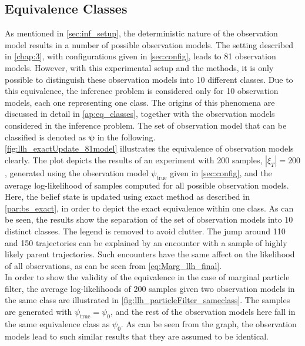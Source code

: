 \subsection{Equivalence Classes}
\label{sec:eq_classes}
As mentioned in \cref{sec:inf_setup}, the deterministic nature of the observation model results in a number of possible observation models. The setting described in \cref{chap:3}, with configurations given in \cref{sec:config}, leads to 81 observation models. However, with this experimental setup and the methods, it is only possible to distinguish these observation models into 10 different classes. Due to this equivalence, the inference problem is considered only for 10 observation models, each one representing one class. The origins of this phenomena are discussed in detail in \cref{ap:eq_classes}, together with the observation models considered in the inference problem. The set of observation model that can be classified is denoted as $ \symbf{\psi} $ in the following. \\
\autoref{fig:llh_exactUpdate_81model} illustrates the equivalence of observation models clearly. The plot depicts the results of an experiment with 200 samples, $ |\xi_T| = 200 $, generated using the observation model $ \psi_{\text{true}} $ given in \cref{sec:config}, and the average log-likelihood of samples computed for all possible observation models. Here, the belief state is updated using exact method as described in \cref{par:bs_exact}, in order to depict the exact equivalence within one class. As can be seen, the results show the separation of the set of observation models into 10 distinct classes. The legend is removed to avoid clutter. The jump around 110 and 150 trajectories can be explained by an encounter with a sample of highly likely parent trajectories. Such encounters have the same affect on the likelihood of all observations, as can be seen from \autoref{eq:Marg_llh_final}.\\
In order to show the validity of the equivalence in the case of marginal particle filter, the average log-likelihoods of 200 samples given two observation models in the same class are illustrated in \autoref{fig:llh_particleFilter_sameclass}. The samples are generated with $ \psi_{\text{true}} = \psi_{0} $, and the rest of the observation models here fall in the same equivalence class as $ \psi_0 $. As can be seen from the graph, the observation models lead to such similar results that they are assumed to be identical. 
